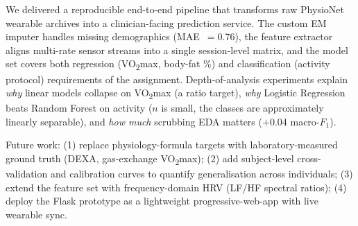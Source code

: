 \documentclass[sigconf,nonacm]{acmart}
\begin{document}
We delivered a reproducible end-to-end pipeline that transforms raw
PhysioNet wearable archives into a clinician-facing prediction service.
The custom EM imputer handles missing demographics
(MAE~$=0.76$), the feature extractor aligns multi-rate sensor streams
into a single session-level matrix, and the model set covers both
regression (VO\textsubscript{2}max, body-fat \%) and classification
(activity protocol) requirements of the assignment. Depth-of-analysis
experiments explain \emph{why} linear models collapse on
VO\textsubscript{2}max (a ratio target), \emph{why} Logistic
Regression beats Random Forest on activity ($n$ is small, the classes
are approximately linearly separable), and \emph{how much} scrubbing
EDA matters ($+0.04$ macro-$F_{1}$).

Future work:
(1) replace physiology-formula targets with laboratory-measured
ground truth (DEXA, gas-exchange VO\textsubscript{2}max);
(2) add subject-level cross-validation and calibration curves to
quantify generalisation across individuals;
(3) extend the feature set with frequency-domain HRV
(LF/HF spectral ratios);
(4) deploy the Flask prototype as a lightweight progressive-web-app
with live wearable sync.
\end{document}
